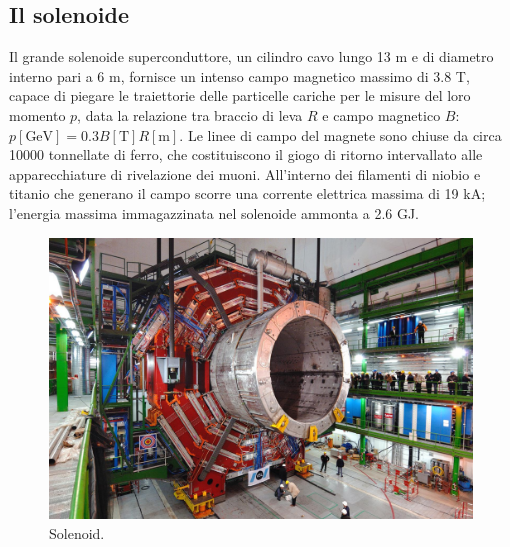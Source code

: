 \subsection{Il solenoide}
Il grande solenoide superconduttore, un cilindro cavo lungo 13 m e di diametro interno pari a 6 m, fornisce un intenso campo magnetico massimo di 3.8 T, capace di piegare le traiettorie delle particelle cariche per le misure del loro momento $p$, data la relazione tra braccio di leva $R$ e campo magnetico $B$: $p [\text{GeV}] = 0.3 B [\text{T}] R [\text{m}]$. Le linee di campo del magnete sono chiuse da circa 10000 tonnellate di ferro, che costituiscono il giogo di ritorno intervallato alle apparecchiature di rivelazione dei muoni. All'interno dei filamenti di niobio e titanio che generano il campo scorre una corrente elettrica massima di 19 kA; l'energia massima immagazzinata nel solenoide ammonta a 2.6 GJ.
\begin{figure}[!htb]
  \centering
    \includegraphics[width=.5\textwidth]{figures/CMS_solenoid.jpeg}
  \caption{Solenoid.}
  \label{fig:CMS_solenoid}
\end{figure}

